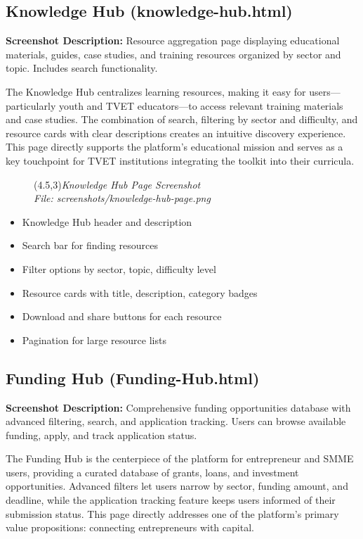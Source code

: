 \documentclass[a4paper,12pt]{article}
\begin{document}
\subsection{Knowledge Hub (knowledge-hub.html)}
\textbf{Screenshot Description:} Resource aggregation page displaying educational materials, guides, case studies, and training resources organized by sector and topic. Includes search functionality.

The Knowledge Hub centralizes learning resources, making it easy for users—particularly youth and TVET educators—to access relevant training materials and case studies. The combination of search, filtering by sector and difficulty, and resource cards with clear descriptions creates an intuitive discovery experience. This page directly supports the platform's educational mission and serves as a key touchpoint for TVET institutions integrating the toolkit into their curricula.

\begin{figure}[h]
    \centering
    \framebox(4.5,3){\textit{Knowledge Hub Page Screenshot}}\\
    \small\textit{File: screenshots/knowledge-hub-page.png}
\end{figure}

\begin{itemize}
    \item Knowledge Hub header and description
    \item Search bar for finding resources
    \item Filter options by sector, topic, difficulty level
    \item Resource cards with title, description, category badges
    \item Download and share buttons for each resource
    \item Pagination for large resource lists
\end{itemize}

\subsection{Funding Hub (Funding-Hub.html)}
\textbf{Screenshot Description:} Comprehensive funding opportunities database with advanced filtering, search, and application tracking. Users can browse available funding, apply, and track application status.

The Funding Hub is the centerpiece of the platform for entrepreneur and SMME users, providing a curated database of grants, loans, and investment opportunities. Advanced filters let users narrow by sector, funding amount, and deadline, while the application tracking feature keeps users informed of their submission status. This page directly addresses one of the platform's primary value propositions: connecting entrepreneurs with capital.
\end{document}
